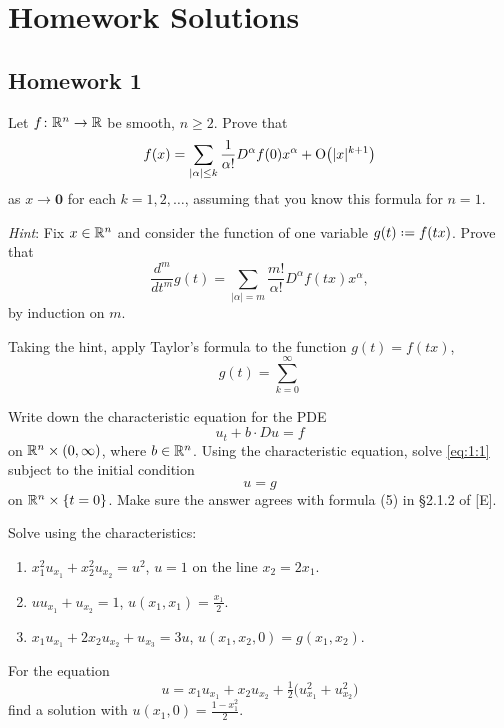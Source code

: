 \section{Homework Solutions}
\subsection{Homework 1}
\begin{problem}
  Let \(f\colon\mathbb{R}^n\to\mathbb{R}\) be smooth, \(n\geq 2\). Prove that
  \[
    f(x)=\sum_{|\alpha|\leq k}
    \frac{1}{\alpha!}D^\alpha f(0)x^\alpha+\mathrm{O}\bigl(|x|^{k+1}\bigr)
  \]
  as \(x\to\mathbf{0}\) for each \(k=1,2,\dotsc\), assuming that you know this
  formula for \(n=1\).

  \noindent \emph{Hint}: Fix \(x\in\mathbb{R}^n\) and consider the function of
  one variable \(g(t)\defeq f(tx)\). Prove that
  \[
    \frac{d^m}{dt^m}g(t)
    =\sum_{|\alpha|=m}\frac{m!}{\alpha!} D^\alpha f(tx)x^\alpha,
  \]
  by induction on \(m\).
\end{problem}
\begin{solution*}
  Taking the hint, apply Taylor's formula to the function \(g(t)=f(tx)\),
  \[
    g(t)=\sum_{k=0}^\infty
  \]
\end{solution*}

\begin{problem}
  Write down the characteristic equation for the PDE
  \[
    \label{eq:1:1}
    \tag{\(*\)}
    u_t+b\cdot Du=f
  \]
  on \(\mathbb{R}^n\times(0,\infty)\), where \(b\in\mathbb{R}^n\). Using the
  characteristic equation, solve \eqref{eq:1:1} subject to the initial
  condition
  \[
    u=g
  \]
  on \(\mathbb{R}^n\times\{t=0\}\). Make sure the answer agrees with formula (5)
  in \S 2.1.2 of [E].
\end{problem}
\begin{solution*}
\end{solution*}

\begin{problem}
  Solve using the characteristics:
  \begin{enumerate}[label=(\alph*)]
  \item \(x_1^2u_{x_1}+x_2^2u_{x_2}=u^2\), \(u=1\) on the line
    \(x_2=2x_1\).
  \item \(uu_{x_1}+u_{x_2}=1\), \(u(x_1,x_1)=\frac{x_1}{2}\).
  \item \(x_1u_{x_1}+2x_2u_{x_2}+u_{x_3}=3u\),
    \(u(x_1,x_2,0)=g(x_1,x_2)\).
  \end{enumerate}
\end{problem}
\begin{solution*}
\end{solution*}

\begin{problem}
  For the equation
  \[
    u=x_1u_{x_1}+x_2u_{x_2}
    +\tfrac{1}{2}\bigl(u_{x_1}^2+u_{x_2}^2\bigr)
  \]
  find a solution with \(u(x_1,0)=\frac{1-x_1^2}{2}\).
\end{problem}
\begin{solution*}
\end{solution*}

